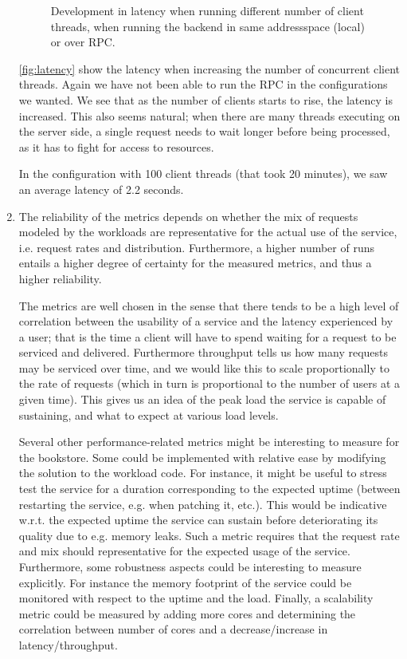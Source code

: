 \documentclass[11pt,a4paper,english]{article}
\begin{document}
\begin{enumerate}
\begin{figure}[H]
  \centering
  \caption{Development in latency when running different number of
    client threads, when running the backend in same addressspace (local) or
    over RPC.}
  \label{fig:latency}
\end{figure}

\autoref{fig:latency} show the latency when increasing the number of concurrent
client threads. Again we have not been able to run the RPC in the configurations
we wanted. We see that as the number of clients starts to rise, the latency is
increased. This also seems natural; when there are many threads executing on the
server side, a single request needs to wait longer before being processed, as it
has to fight for access to resources.

In the configuration with 100 client threads (that took 20 minutes), we saw an average
latency of 2.2 seconds.

\item The reliability of the metrics depends on whether the mix of requests modeled by the workloads are representative for the actual use of the service, i.e. request rates and distribution. Furthermore, a higher number of runs entails a higher degree of certainty for the measured metrics, and thus a higher reliability.

The metrics are well chosen in the sense that there tends to be a high level of correlation between the usability of a service and the latency experienced by a user; that is the time a client will have to spend waiting for a request to be serviced and delivered. Furthermore throughput tells us how many requests may be serviced over time, and we would like this to scale proportionally to the rate of requests (which in turn is proportional to the number of users at a given time). This gives us an idea of the peak load the service is capable of sustaining, and what to expect at various load levels.

Several other performance-related metrics might be interesting to measure for the bookstore. Some could be implemented with relative ease by modifying the solution to the workload code. For instance, it might be useful to stress test the service for a duration corresponding to the expected uptime (between restarting the service, e.g. when patching it, etc.). This would be indicative w.r.t. the expected uptime the service can sustain before deteriorating its quality due to e.g. memory leaks. Such a metric requires that the request rate and mix should representative for the expected usage of the service. Furthermore, some robustness aspects could be interesting to measure explicitly. For instance the memory footprint of the service could be monitored with respect to the uptime and the load. Finally, a scalability metric could be measured by adding more cores and determining the correlation between number of cores and a decrease/increase in latency/throughput.
\end{enumerate}
\end{document}
